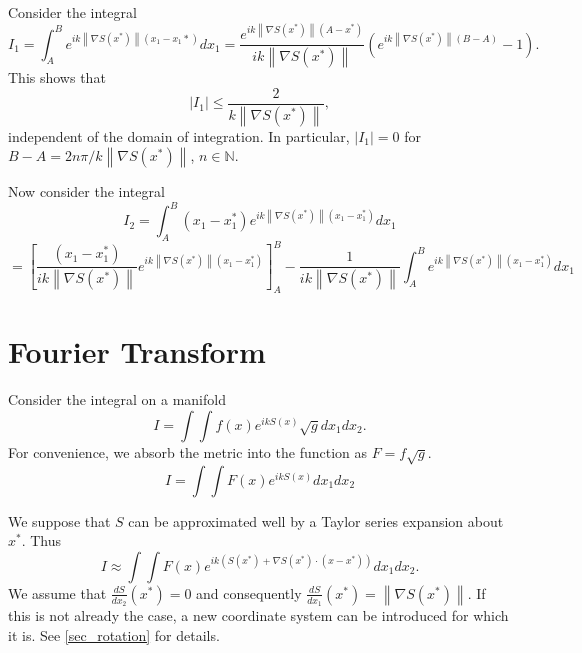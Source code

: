 \documentclass{article}
\newcommand{\norm}[1]{\left\lVert#1\right\rVert}
\theoremstyle{plain}
\begin{document}

Consider the integral
\begin{equation}
	I_1 = \int_A^B e^{ik\norm{\nabla S(x^*)}(x_1-x_1*)} dx_1 
	= \frac{e^{ik\norm{\nabla S(x^*)}(A-x^*)}}{ik\norm{\nabla S(x^*)}}
	\left( e^{ik\norm{\nabla S(x^*)}(B-A)}-1 \right).
\end{equation}
This shows that
\begin{equation}
	|I_1| \leq \frac{2}{k\norm{\nabla S(x^*)}},
\end{equation}
independent of the domain of integration.
In particular, $|I_1| = 0$ for $B-A = 2n\pi / k\norm{\nabla S(x^*)}$, $n\in\mathbb{N}$.

Now consider the integral 
\begin{equation*}
	I_2 = \int_A^B (x_1-x_1^*) e^{ik\norm{\nabla S(x^*)}(x_1-x_1^*)} dx_1
\end{equation*}
\begin{equation}
	= \left[ \frac{(x_1-x_1^*)}{ik\norm{\nabla S(x^*)}} e^{ik\norm{\nabla S(x^*)}(x_1-x_1^*)} \right]_A^B
	- \frac{1}{ik\norm{\nabla S(x^*)}}\int_A^B e^{ik\norm{\nabla S(x^*)}(x_1-x_1^*)} dx_1
\end{equation}



\section{Fourier Transform}

Consider the integral on a manifold
\begin{equation}
	I = \int\int f(x) e^{ikS(x)} \sqrt{g} dx_1dx_2.
\end{equation}
For convenience, we absorb the metric into the function as  $F = f\sqrt{g}$.
\begin{equation}
	I = \int\int F(x) e^{ikS(x)} dx_1dx_2
\end{equation}



We suppose that $S$ can be approximated well by a Taylor series expansion about $x^*$.
Thus
\begin{equation}
	I \approx \int\int F(x) e^{ik\left(S(x^*) + \nabla S(x^*)\cdot (x-x^*) \right)} dx_1dx_2.
\end{equation}
We assume that $\frac{dS}{dx_2}(x^*) = 0$ and consequently $\frac{dS}{dx_1}(x^*) = \norm{\nabla S(x^*)}$.
If this is not already the case, a new coordinate system can be introduced for which it is. See \ref{sec_rotation} for details.
\end{document}
